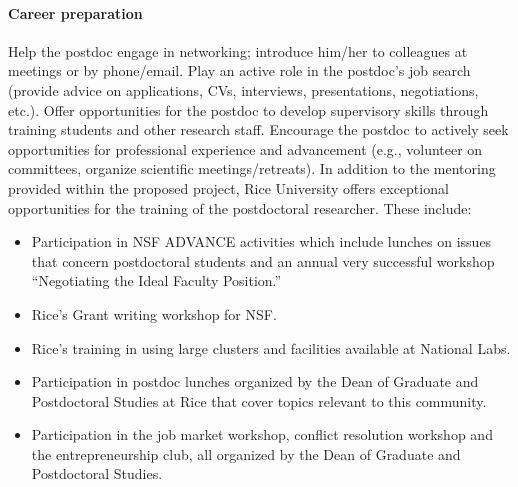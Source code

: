 \paragraph{Career preparation}
Help the postdoc engage in networking; introduce him/her to
colleagues at meetings or by phone/email.
Play an active role in the postdoc's job search (provide advice on
applications, CVs, interviews, presentations, negotiations, etc.).
Offer opportunities for the postdoc to develop supervisory skills
through training students and other research staff.
Encourage the postdoc to actively seek opportunities for professional
experience and advancement (e.g., volunteer on committees, organize
scientific meetings/retreats).
In addition to the mentoring provided within the proposed project,  
Rice University offers exceptional opportunities for the training of the
postdoctoral researcher. These include:
\begin{itemize}
\item Participation in NSF ADVANCE activities which include lunches on issues that concern postdoctoral students and an annual very successful workshop ``Negotiating the Ideal Faculty Position.''
\item Rice's Grant writing workshop for NSF.
\item Rice's training in using large clusters and facilities available
  at National Labs.
\item Participation in postdoc lunches organized by the Dean of Graduate and Postdoctoral Studies at Rice that cover topics relevant to this community.
\item Participation in the job market workshop, conflict resolution workshop and the entrepreneurship club, all organized by the Dean of Graduate and Postdoctoral Studies.
\end{itemize}
